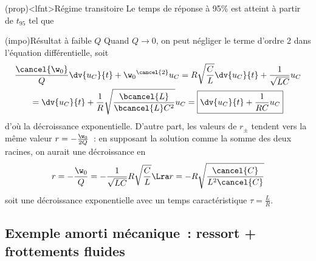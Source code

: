 \documentclass[../../main/main.tex]{subfiles}
\begin{document}
\begin{tcb}[label=prop:transiaper](prop)<lfnt>{Régime transitoire}
	Le temps de réponse à 95\% est atteint à partir de $t_{95}$ tel que
\end{tcb}
\begin{tcb}[label=impo:aperpetitQ](impo){Résultat à faible $Q$}
	Quand $Q \longrightarrow 0$, on peut négliger le terme d'ordre 2 dans
	l'équation différentielle, soit
	\begin{gather*}
		\frac{\cancel{\w_0}}{Q}\dv{u_C}{t} +
		\w_0{}^{\cancel{2}}u_C = R \sqrt{\frac{C}{L}} \dv{u_C}{t} +
		\frac{1}{\sqrt{LC}}u_C \\
		=
		\dv{u_C}{t} + \frac{1}{R}
		\sqrt{\frac{\bcancel{L}}{\bcancel{L}C^2}} u_C
		=
		\boxed{ \dv{u_C}{t} +
			\frac{1}{RC} u_C}
	\end{gather*}
	d'où la décroissance exponentielle. D'autre part, les valeurs de $r_\pm$
	tendent vers la même valeur $r = - \frac{\w_0}{2Q}$~: en supposant la solution
	comme la somme des deux racines, on aurait une décroissance en
	\begin{gather*}
		r = -\frac{\w_0}{Q} = - \frac{1}{\sqrt{LC}}R
		\sqrt{\frac{C}{L}}
		\Lra
		r = -R \sqrt{\frac{\cancel{C}}{L^2\cancel{C}}}
	\end{gather*}
	soit une décroissance exponentielle avec un temps
	caractéristique $\tau = \frac{L}{R}$.
\end{tcb}

\vspace{-15pt}
\subsection{Exemple amorti mécanique~: ressort + frottements fluides}
\end{document}
